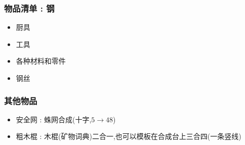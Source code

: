 {{      \subsubsection{物品清单 : 钢}{
          \begin{itemize}
              \item 厨具
              \item 工具
              \item 各种材料和零件
              \item 钢丝
          \end{itemize}
      }

      \subsubsection{其他物品}{
          \begin{itemize}
              \item 安全网 : 蛛网合成(十字,$5 \to 48$)
              \item 粗木棍 : 木棍(矿物词典)二合一,也可以模板在合成台上三合四(一条竖线)
          \end{itemize}

      }
  }
 }